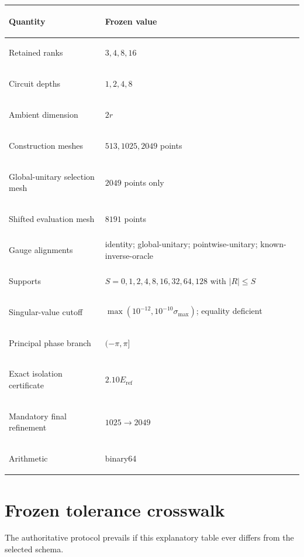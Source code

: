 \documentclass[11pt]{article}
\newcommand{\Eref}{E_{\mathrm{ref}}}
\begin{document}
\begin{center}\small
\begin{tabularx}{\textwidth}{>{\bfseries\raggedright\arraybackslash}p{}Y}
\toprule
Quantity & Frozen value \\
\midrule
Retained ranks & $3,4,8,16$ \\
Circuit depths & $1,2,4,8$ \\
Ambient dimension & $2r$ \\
Construction meshes & $513,1025,2049$ points \\
Global-unitary selection mesh & $2049$ points only \\
Shifted evaluation mesh & $8191$ points \\
Gauge alignments & identity; global-unitary; pointwise-unitary; known-inverse-oracle \\
Supports & $S=0,1,2,4,8,16,32,64,128$ with $|R|\leq S$ \\
Singular-value cutoff & $\max(10^{-12},10^{-10}\sigma_{\max})$; equality deficient \\
Principal phase branch & $(-\pi,\pi]$ \\
Exact isolation certificate & $2.10\Eref$ \\
Mandatory final refinement & $1025\rightarrow2049$ \\
Arithmetic & binary64 \\
\bottomrule
\end{tabularx}
\end{center}

\section{Frozen tolerance crosswalk}
\label{app:tolerances}

The authoritative protocol prevails if this explanatory table ever differs from the
selected schema.
\end{document}

